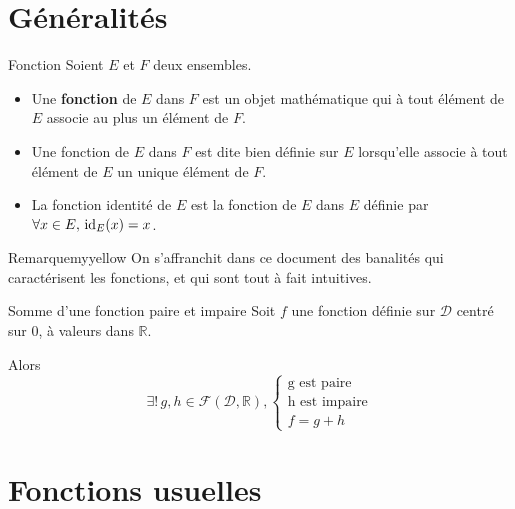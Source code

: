 
\section{Généralités}

    \begin{defi}{Fonction}{}
	    Soient $E$ et $F$ deux ensembles.
	    \begin{itemize}
		    \item Une \textbf{fonction} de $E$ dans $F$ est un objet mathématique qui à tout élément de $E$ associe au plus un élément de $F$.
		    \item Une fonction de $E$ dans $F$ est dite bien définie sur $E$ lorsqu’elle associe à tout élément de $E$ un unique élément de $F$.
		    \item La fonction identité de $E$ est la fonction de $E$ dans $E$ définie par $\forall x \in E, \, \operatorname{id}_E(x) = x$.
	    \end{itemize}
    \end{defi}

    \begin{omed}{Remarque}{myyellow}
        On s’affranchit dans ce document des banalités qui caractérisent les fonctions, et qui sont tout à fait intuitives.
    \end{omed}

    \begin{prop}{Somme d’une fonction paire et impaire}{}
        Soit $f$ une fonction définie sur $\mathcal{D}$ centré sur $0$, à valeurs dans $\mathbb{R}$.
    
        Alors \[ \exists ! \, g,h \in \mathcal{F}(\mathcal{D},\mathbb{R}), \left\{  \begin{array}{l}
            \text{g est paire}\\
            \text{h est impaire}\\
            f = g + h
            \end{array} \right.  \]
    \end{prop}

\section{Fonctions usuelles}

